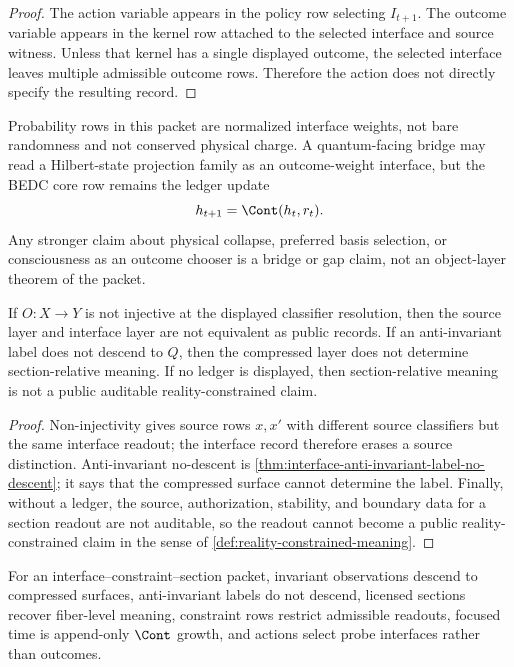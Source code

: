 \begin{proof}
The action variable appears in the policy row selecting $I_{t+1}$. The
outcome variable appears in the kernel row attached to the selected
interface and source witness. Unless that kernel has a single displayed
outcome, the selected interface leaves multiple admissible outcome rows.
Therefore the action does not directly specify the resulting record.
\end{proof}

\begin{principle}
\label{prin:probability-collapse-bridge-boundary}
Probability rows in this packet are normalized interface weights, not
bare randomness and not conserved physical charge. A quantum-facing bridge
may read a Hilbert-state projection family as an outcome-weight interface,
but the BEDC core row remains the ledger update
$$
h_{t+1}=\Cont(h_t,r_t).
$$
Any stronger claim about physical collapse, preferred basis selection,
or consciousness as an outcome chooser is a bridge or gap claim, not an
object-layer theorem of the packet.
\end{principle}

\begin{theorem}
\label{thm:layered-reality-decomposition}
If $O:X\to Y$ is not injective at the displayed classifier resolution,
then the source layer and interface layer are not equivalent as public
records. If an anti-invariant label does not descend to $Q$, then the
compressed layer does not determine section-relative meaning. If no
ledger is displayed, then section-relative meaning is not a public
auditable reality-constrained claim.
\end{theorem}

\begin{proof}
Non-injectivity gives source rows $x,x'$ with different source
classifiers but the same interface readout; the interface record therefore
erases a source distinction. Anti-invariant no-descent is
\autoref{thm:interface-anti-invariant-label-no-descent}; it says that
the compressed surface cannot determine the label. Finally, without a
ledger, the source, authorization, stability, and boundary data for a
section readout are not auditable, so the readout cannot become a public
reality-constrained claim in the sense of
\autoref{def:reality-constrained-meaning}.
\end{proof}

\begin{theorem}
\label{thm:interface-constraint-section-synthesis}
For an interface--constraint--section packet, invariant observations
descend to compressed surfaces, anti-invariant labels do not descend,
licensed sections recover fiber-level meaning, constraint rows restrict
admissible readouts, focused time is append-only $\Cont$ growth, and
actions select probe interfaces rather than outcomes.
\end{theorem}

